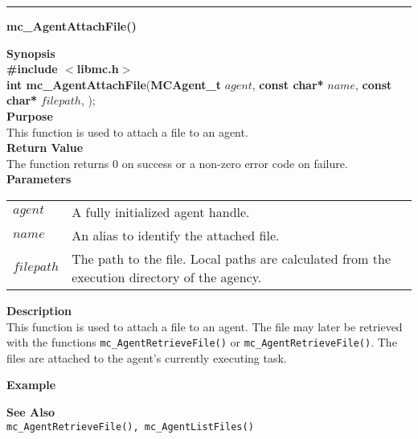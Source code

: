 \noindent
\vspace{5pt}
\rule{6.5in}{0.015in}
\noindent
{}
{\LARGE \bf mc\_AgentAttachFile()}\\

\noindent
{\bf Synopsis}\\
{\bf \#include $<$libmc.h$>$}\\
{\bf int mc\_AgentAttachFile}({\bf MCAgent\_t} $agent$, 
                                  {\bf const char*} $name$,
                                  {\bf const char*} $filepath$,
																	);\\

\noindent
{\bf Purpose}\\
This function is used to attach a file to an agent.\\

\noindent
{\bf Return Value}\\
The function returns 0 on success or a non-zero error code on failure.\\

\noindent
{\bf Parameters}
\vspace{-0.1in}
\begin{description}
\item
\begin{tabular}{p{30 mm}p{125 mm}} 
$agent$ & A fully initialized agent handle.\\
$name$ & An alias to identify the attached file.\\
$filepath$ & The path to the file. Local paths are calculated from the
execution directory of the agency.\\
\end{tabular}
\end{description}

\noindent
{\bf Description}\\
This function is used to attach a file to an agent. The file may later be retrieved
with the functions \texttt{mc\_AgentRetrieveFile()} or
\texttt{mc\_AgentRetrieveFile()}. The files are attached to the
agent's currently executing task.

\noindent
{\bf Example}\\
\noindent
{\footnotesize}
{\footnotesize}

\noindent
{\bf See Also}\\
\texttt{mc\_AgentRetrieveFile(), mc\_AgentListFiles()}


